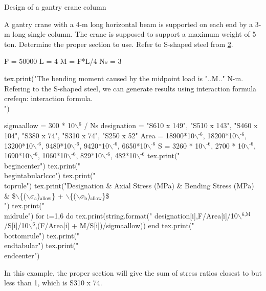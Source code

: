 \documentclass[a4paper,openany,12pt]{book}
\begin{document}
{{\begin{enumerate}
Design of a gantry crane column

A gantry crane with a 4-m long horizontal beam is supported on each end
by a 3-m long single column. The crane is supposed to support a maximum
weight of 5 ton. Determine the proper section to use. Refer to S-shaped
steel from \hyperref[sec:org8775520]{2}.

F = 50000 L = 4 M = F*L/4 Ns = 3

tex.print("The bending moment caused by the midpoint load is "..M.."
N-m. Refering to the S-shaped steel, we can generate results using
interaction formula\\
crefeqn: interaction formula.\\

")

sigmaallow = 300 * 10$\backslash$\(^{\text{6}}\) / Ns designation = "S610 x 149", "S510 x 143",
"S460 x 104", "S380 x 74", "S310 x 74", "S250 x 52" Area = 18900*10$\backslash$\(^{\text{-6}}\),
18200*10$\backslash$\(^{\text{-6}}\), 13200*10$\backslash$\(^{\text{-6}}\), 9480*10$\backslash$\(^{\text{-6}}\), 9420*10$\backslash$\(^{\text{-6}}\), 6650*10$\backslash$\(^{\text{-6}}\) S =
3260 * 10$\backslash$\(^{\text{-6}}\), 2700 * 10$\backslash$\(^{\text{-6}}\), 1690*10$\backslash$\(^{\text{-6}}\), 1060*10$\backslash$\(^{\text{-6}}\), 829*10$\backslash$\(^{\text{-6}}\),
482*10$\backslash$\(^{\text{-6}}\) tex.print("\\
begincenter") tex.print("\\
begintabularlccc") tex.print("\\
toprule") tex.print("Designation \& Axial Stress (MPa) \& Bending Stress
(MPa) \&
\$$\backslash$\{($\backslash$\(\sigma_{\text{a}}\))\(_{\text{allow}}\)\} + $\backslash$\{($\backslash$\(\sigma_{\text{b}}\))\(_{\text{allow}}\)\}\$\\

") tex.print("\\
midrule") for i=1,6 do tex.print(string.format("
designation[i],F/Area[i]/10$\backslash$\(^{\text{6,M}}\)/S[i]/10$\backslash$\(^{\text{6}}\),(F/Area[i] +
M/S[i])/sigmaallow)) end tex.print("\\
bottomrule") tex.print("\\
endtabular") tex.print("\\
endcenter")

In this example, the proper section will give the sum of stress ratios
closest to but less than 1, which is S310 x 74.


\end{enumerate}}}
\end{document}

